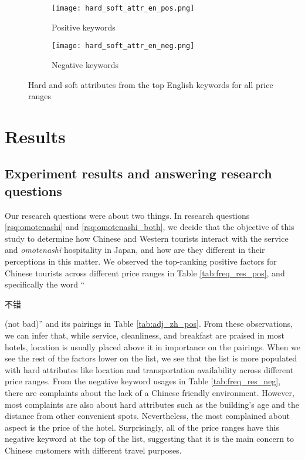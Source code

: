 \documentclass[smallextended,natbib]{svjour3}       %
\begin{document}
  \begin{figure}[ht]
      \centering
      \begin{subfigure}[b]{0.45\textwidth}
          \texttt{[image: hard\_soft\_attr\_en\_pos.png]}
          \caption{Positive keywords}
      \end{subfigure}
      \begin{subfigure}[b]{0.45\textwidth}
          \texttt{[image: hard\_soft\_attr\_en\_neg.png]}
          \caption{Negative keywords}
      \end{subfigure}
  \caption{Hard and soft attributes from the top English keywords for all price ranges}
  \label{fig:hard_soft_en}
  \end{figure}


\section{Results}\label{results}

  \subsection{Experiment results and answering research questions}

    Our research questions were about two things. In research questions \ref{rsq:omotenashi} and \ref{rsq:omotenashi_both}, we decide that the objective of this study to determine how Chinese and Western tourists interact with the service and \textit{omotenashi} hospitality in Japan, and how are they different in their perceptions in this matter. We observed the top-ranking positive factors for Chinese tourists across different price ranges in Table \ref{tab:freq_res_pos}, and specifically the word ``\begin{CJK}{UTF8}{gbsn}不错\end{CJK} (not bad)'' and its pairings in Table \ref{tab:adj_zh_pos}. From these observations, we can infer that, while service, cleanliness, and breakfast are praised in most hotels, location is usually placed above it in importance on the pairings. When we see the rest of the factors lower on the list, we see that the list is more populated with hard attributes like location and transportation availability across different price ranges. From the negative keyword usages in Table \ref{tab:freq_res_neg}, there are complaints about the lack of a Chinese friendly environment. However, most complaints are also about hard attributes such as the building's age and the distance from other convenient spots. Nevertheless, the most complained about aspect is the price of the hotel. Surprisingly, all of the price ranges have this negative keyword at the top of the list, suggesting that it is the main concern to Chinese customers with different travel purposes.
\end{document}
